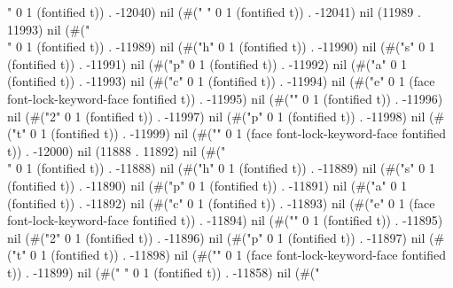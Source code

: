 " 0 1 (fontified t)) . -12040) nil (#(" " 0 1 (fontified t)) . -12041) nil (11989 . 11993) nil (#("\\" 0 1 (fontified t)) . -11989) nil (#("h" 0 1 (fontified t)) . -11990) nil (#("s" 0 1 (fontified t)) . -11991) nil (#("p" 0 1 (fontified t)) . -11992) nil (#("a" 0 1 (fontified t)) . -11993) nil (#("c" 0 1 (fontified t)) . -11994) nil (#("e" 0 1 (face font-lock-keyword-face fontified t)) . -11995) nil (#("{" 0 1 (fontified t)) . -11996) nil (#("2" 0 1 (fontified t)) . -11997) nil (#("p" 0 1 (fontified t)) . -11998) nil (#("t" 0 1 (fontified t)) . -11999) nil (#("}" 0 1 (face font-lock-keyword-face fontified t)) . -12000) nil (11888 . 11892) nil (#("\\" 0 1 (fontified t)) . -11888) nil (#("h" 0 1 (fontified t)) . -11889) nil (#("s" 0 1 (fontified t)) . -11890) nil (#("p" 0 1 (fontified t)) . -11891) nil (#("a" 0 1 (fontified t)) . -11892) nil (#("c" 0 1 (fontified t)) . -11893) nil (#("e" 0 1 (face font-lock-keyword-face fontified t)) . -11894) nil (#("{" 0 1 (fontified t)) . -11895) nil (#("2" 0 1 (fontified t)) . -11896) nil (#("p" 0 1 (fontified t)) . -11897) nil (#("t" 0 1 (fontified t)) . -11898) nil (#("}" 0 1 (face font-lock-keyword-face fontified t)) . -11899) nil (#(" " 0 1 (fontified t)) . -11858) nil (#("
